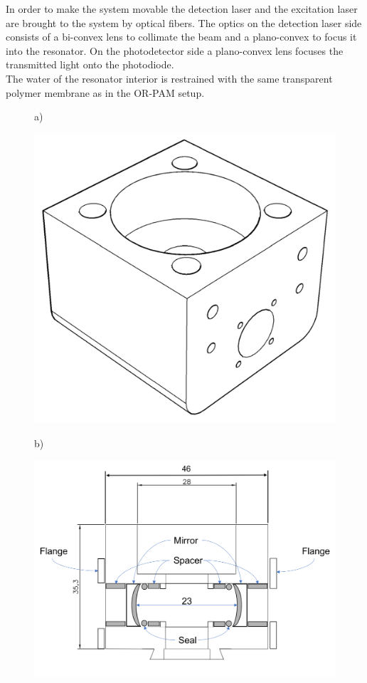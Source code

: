 In order to make the system movable the detection laser and the excitation laser are brought to the system by optical fibers. The optics on the detection laser side consists of a bi-convex lens to collimate the beam and a plano-convex to focus it into the resonator. On the photodetector side a plano-convex lens focuses the transmitted light onto the photodiode. \\
The water of the resonator interior is restrained with the same transparent polymer membrane as in the OR-PAM setup.\\

\begin{figure}[H]
	a)
	\begin{minipage}{0.5\textwidth}
		
		\includegraphics[width = \textwidth, height=0.35\textheight]{05_OUSD/images/res3D.jpg}
	\end{minipage}
	b)
	\begin{minipage}{0.5\textwidth}
		
		\includegraphics[width = \textwidth, height=0.3\textheight]{05_OUSD/images/resCut.jpg}
	\end{minipage}
	

\end{figure}
